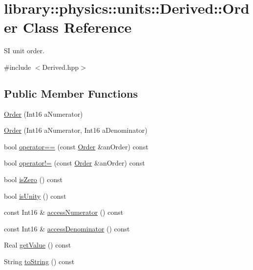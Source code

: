 \hypertarget{classlibrary_1_1physics_1_1units_1_1_derived_1_1_order}{}\section{library\+:\+:physics\+:\+:units\+:\+:Derived\+:\+:Order Class Reference}
\label{classlibrary_1_1physics_1_1units_1_1_derived_1_1_order}


SI unit order.  




{\ttfamily \#include $<$Derived.\+hpp$>$}

\subsection*{Public Member Functions}
\begin{DoxyCompactItemize}
\item 
\hyperlink{classlibrary_1_1physics_1_1units_1_1_derived_1_1_order_adf904bd5a124a6fa6b73e376fa6f94d4}{Order} (Int16 a\+Numerator)
\item 
\hyperlink{classlibrary_1_1physics_1_1units_1_1_derived_1_1_order_a9fc4a7af30cf5dc036ecfd77469d34ef}{Order} (Int16 a\+Numerator, Int16 a\+Denominator)
\item 
bool \hyperlink{classlibrary_1_1physics_1_1units_1_1_derived_1_1_order_a8ebf2f4e2d3248ca01d1baf78ce7cb65}{operator==} (const \hyperlink{classlibrary_1_1physics_1_1units_1_1_derived_1_1_order}{Order} \&an\+Order) const
\item 
bool \hyperlink{classlibrary_1_1physics_1_1units_1_1_derived_1_1_order_a378120863370ff30152cc49c7b6806c4}{operator!=} (const \hyperlink{classlibrary_1_1physics_1_1units_1_1_derived_1_1_order}{Order} \&an\+Order) const
\item 
bool \hyperlink{classlibrary_1_1physics_1_1units_1_1_derived_1_1_order_a29e8185533b5a0b2c1e15831f9f8d57b}{is\+Zero} () const
\item 
bool \hyperlink{classlibrary_1_1physics_1_1units_1_1_derived_1_1_order_a4b3063672bb65d3e601a65b38d50a9c9}{is\+Unity} () const
\item 
const Int16 \& \hyperlink{classlibrary_1_1physics_1_1units_1_1_derived_1_1_order_a2713df67471cd68278c03f0a931247e4}{access\+Numerator} () const
\item 
const Int16 \& \hyperlink{classlibrary_1_1physics_1_1units_1_1_derived_1_1_order_a0dffed071459f2983630e781270891ac}{access\+Denominator} () const
\item 
Real \hyperlink{classlibrary_1_1physics_1_1units_1_1_derived_1_1_order_ad131603297e5a49bde057ee2a0caeacb}{get\+Value} () const
\item 
String \hyperlink{classlibrary_1_1physics_1_1units_1_1_derived_1_1_order_a8fd90d4af443c91824510a087d93a5b4}{to\+String} () const
\end{DoxyCompactItemize}
